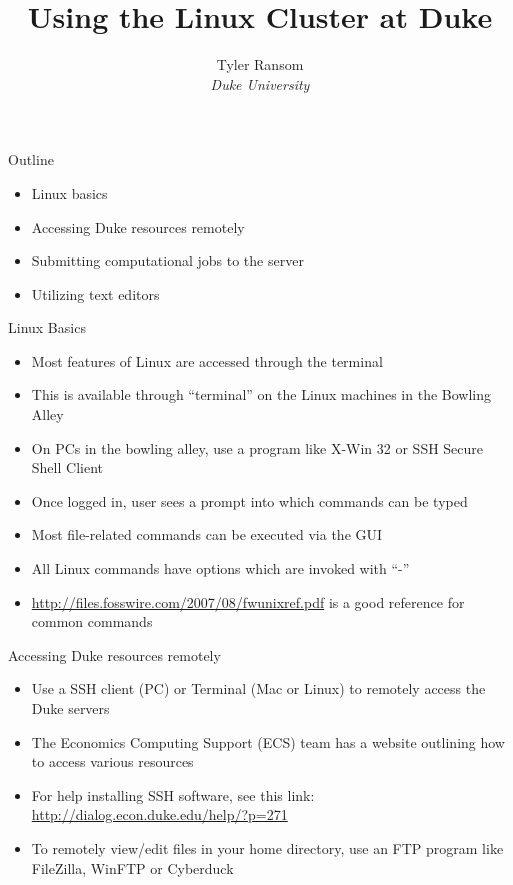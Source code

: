 \documentclass[english,xcolor=dvipsnames]{beamer}
\begin{document}
\begin{frame}
\title{Using the Linux Cluster at Duke}
\author{
	Tyler Ransom\\
	\emph{Duke University}\\
}
\titlepage
\end{frame}

\begin{frame}{Outline}
\begin{itemize}
	\item Linux basics
	\item Accessing Duke resources remotely
	\item Submitting computational jobs to the server
	\item Utilizing text editors
\end{itemize}
\end{frame}

\begin{frame}{Linux Basics}
\begin{itemize}
	\item Most features of Linux are accessed through the terminal
	\item This is available through ``terminal'' on the Linux machines in the Bowling Alley
	\item On PCs in the bowling alley, use a program like X-Win 32 or SSH Secure Shell Client
	\item Once logged in, user sees a prompt into which commands can be typed
	\item Most file-related commands can be executed via the GUI
	\item All Linux commands have options which are invoked with ``-''
	\item \url{http://files.fosswire.com/2007/08/fwunixref.pdf} is a good reference for common commands
\end{itemize}
\end{frame}


\begin{frame}{Accessing Duke resources remotely}
\begin{itemize}
	\item Use a SSH client (PC) or Terminal (Mac or Linux) to remotely access the Duke servers
	\item The Economics Computing Support (ECS) team has a website outlining how to access various resources
	\item For help installing SSH software, see this link: \url{http://dialog.econ.duke.edu/help/?p=271}
	\item To remotely view/edit files in your home directory, use an FTP program like FileZilla, WinFTP or Cyberduck
\end{itemize}
\end{frame}
\end{document}
